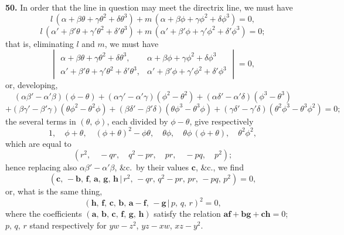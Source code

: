 \documentclass[11pt,a4paper]{article}
\providecommand{\mid}{\,|\,}
\begin{document}
\medskip

\textbf{50.} In order that the line in question may meet the directrix line, we must have
\[
l\,(\alpha + \beta\theta + \gamma\theta^{2} + \delta\theta^{3}) + m\,(\alpha + \beta\phi + \gamma\phi^{2} + \delta\phi^{3}) = 0,
\]
\[
l\,(\alpha' + \beta'\theta + \gamma'\theta^{2} + \delta'\theta^{3}) + m\,(\alpha' + \beta'\phi + \gamma'\phi^{2} + \delta'\phi^{3}) = 0;
\]
that is, eliminating $l$ and $m$, we must have
\[
\begin{vmatrix}
\alpha + \beta\theta + \gamma\theta^{2} + \delta\theta^{3}, & \alpha + \beta\phi + \gamma\phi^{2} + \delta\phi^{3} \\[2pt]
\alpha' + \beta'\theta + \gamma'\theta^{2} + \delta'\theta^{3}, & \alpha' + \beta'\phi + \gamma'\phi^{2} + \delta'\phi^{3}
\end{vmatrix} = 0,
\]
or, developing,
\[
(\alpha\beta' - \alpha'\beta)(\phi - \theta) + (\alpha\gamma' - \alpha'\gamma)(\phi^{2} - \theta^{2}) + (\alpha\delta' - \alpha'\delta)(\phi^{3} - \theta^{3})
\]
\[
+ (\beta\gamma' - \beta'\gamma)(\theta\phi^{2} - \theta^{2}\phi) + (\beta\delta' - \beta'\delta)(\theta\phi^{3} - \theta^{3}\phi) + (\gamma\delta' - \gamma'\delta)(\theta^{2}\phi^{3} - \theta^{3}\phi^{2}) = 0;
\]
the several terms in $(\theta,\,\phi)$, each divided by $\phi - \theta$, give respectively
\[
1,\quad \phi + \theta,\quad (\phi + \theta)^{2} - \phi\theta,\quad \theta\phi,\quad \theta\phi\,(\phi + \theta),\quad \theta^{2}\phi^{2},
\]
which are equal to
\[
(r^{2},\quad -qr,\quad q^{2} - pr,\quad pr,\quad -pq,\quad p^{2});
\]
hence replacing also $\alpha\beta' - \alpha'\beta$, \&c.\ by their values $\mathbf{c}$, \&c., we find
\[
(\mathbf{c},\,-\mathbf{b},\,\mathbf{f},\,\mathbf{a},\,\mathbf{g},\,\mathbf{h}\mid r^{2},\,-qr,\,q^{2} - pr,\,pr,\,-pq,\,p^{2}) = 0,
\]
or, what is the same thing,
\[
(\mathbf{h},\,\mathbf{f},\,\mathbf{c},\,\mathbf{b},\,\mathbf{a} - \mathbf{f},\,-\mathbf{g}\mid p,\,q,\,r)^{2} = 0,
\]
where the coefficients $(\mathbf{a},\,\mathbf{b},\,\mathbf{c},\,\mathbf{f},\,\mathbf{g},\,\mathbf{h})$ satisfy the relation $\mathbf{af + bg + ch} = 0$; $p,\,q,\,r$ stand respectively for $yw - z^{2}$, $yz - xw$, $xz - y^{2}$.
\end{document}
